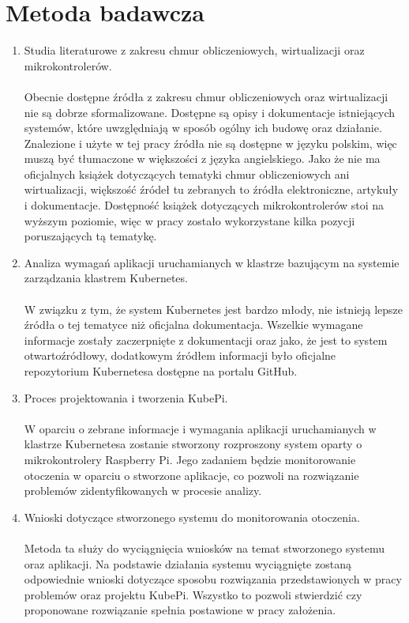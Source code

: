 \documentclass[12pt]{report}
\let\Oldsection\section
\renewcommand{\section}{\FloatBarrier\Oldsection}
\begin{document}
\section{Metoda badawcza}
\begin{enumerate}
\item Studia literaturowe z zakresu chmur obliczeniowych, wirtualizacji oraz mikrokontrolerów. \\ \\
Obecnie dostępne źródła z zakresu chmur obliczeniowych oraz wirtualizacji nie są dobrze sformalizowane. Dostępne są opisy i dokumentacje istniejących systemów, które uwzględniają
w sposób ogólny ich budowę oraz działanie. Znalezione i użyte w tej pracy źródła nie są dostępne w języku polskim, więc muszą być tłumaczone w większości z języka angielskiego.
Jako że nie ma oficjalnych książek dotyczących tematyki chmur obliczeniowych ani wirtualizacji, większość źródeł tu zebranych to źródła elektroniczne, artykuły i dokumentacje. Dostępność książek dotyczących mikrokontrolerów stoi na wyższym poziomie, więc w pracy zostało wykorzystane kilka pozycji poruszających tą tematykę.
\item Analiza wymagań aplikacji uruchamianych w klastrze bazującym na systemie zarządzania klastrem Kubernetes. \\ \\
W związku z tym, że system Kubernetes jest bardzo młody, nie istnieją lepsze źródła o tej tematyce niż oficjalna dokumentacja. Wszelkie wymagane informacje zostały zaczerpnięte z dokumentacji oraz jako, że jest to system otwartoźródłowy, dodatkowym źródłem informacji było oficjalne repozytorium Kubernetesa dostępne na portalu GitHub.
\item Proces projektowania i tworzenia KubePi. \\ \\
W oparciu o zebrane informacje i wymagania aplikacji uruchamianych w klastrze Kubernetesa zostanie stworzony rozproszony system oparty o mikrokontrolery Raspberry Pi. Jego zadaniem będzie monitorowanie otoczenia w oparciu o stworzone aplikacje, co pozwoli na rozwiązanie problemów zidentyfikowanych w procesie analizy.
\item Wnioski dotyczące stworzonego systemu do monitorowania otoczenia. \\ \\
Metoda ta służy do wyciągnięcia wniosków na temat stworzonego systemu oraz aplikacji. Na podstawie działania systemu wyciągnięte zostaną odpowiednie wnioski dotyczące sposobu rozwiązania przedstawionych w pracy problemów oraz projektu KubePi. Wszystko to pozwoli stwierdzić czy proponowane rozwiązanie spełnia postawione w pracy założenia.

\end{enumerate}
\end{document}
